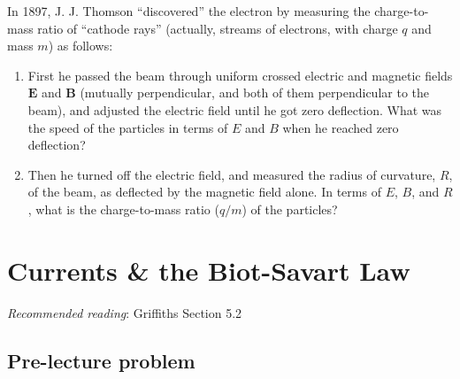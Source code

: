 \documentclass[
  letterpaper,
  DIV=11,
  numbers=noendperiod]{scrreprt}
\begin{document}
In 1897, J. J. Thomson ``discovered'' the electron by measuring the
charge-to-mass ratio of ``cathode rays'' (actually, streams of
electrons, with charge \(q\) and mass \(m\)) as follows:

\begin{enumerate}
\def\labelenumi{(\alph{enumi})}
\item
  First he passed the beam through uniform crossed electric and magnetic
  fields \(\mathrm{\mathbf{E}}\) and \(\mathrm{\mathbf{B}}\) (mutually
  perpendicular, and both of them perpendicular to the beam), and
  adjusted the electric field until he got zero deflection. What was the
  speed of the particles in terms of \(E\) and \(B\) when he reached
  zero deflection?
\item
  Then he turned off the electric field, and measured the radius of
  curvature, \(R\), of the beam, as deflected by the magnetic field
  alone. In terms of \(E\), \(B\), and \(R\), what is the charge-to-mass
  ratio (\(q/m\)) of the particles?
\end{enumerate}


\chapter{Currents \& the Biot-Savart
Law}\label{currents-the-biot-savart-law}

\newcommand{\l}{\mathrm{\mathbf{l}}}
\newcommand{\E}{\mathrm{\mathbf{E}}}
\newcommand{\F}{\mathrm{\mathbf{F}}}
\newcommand{\r}{\mathrm{\mathbf{r}}}
\newcommand{\B}{\mathrm{\mathbf{B}}}
\newcommand{\A}{\mathrm{\mathbf{A}}}
\newcommand{\x}{\mathrm{\mathbf{x}}}
\newcommand{\y}{\mathrm{\mathbf{y}}}
\newcommand{\z}{\mathrm{\mathbf{z}}}
\newcommand{\v}{\mathrm{\mathbf{v}}}
\newcommand{\p}{\mathrm{\mathbf{p}}}
\newcommand{\d}{\mathrm{\mathbf{d}}}

\newcommand{\a}{\mathrm{\mathbf{a}}}
\newcommand{\b}{\mathrm{\mathbf{b}}}
\newcommand{\I}{\mathrm{\mathbf{I}}}
\newcommand{\K}{\mathrm{\mathbf{K}}}
\newcommand{\J}{\mathrm{\mathbf{J}}}
\newcommand{\A}{\mathrm{\mathbf{A}}}
\newcommand{\dd}{\mathrm{d}}

\emph{Recommended reading}: Griffiths Section 5.2

\section{Pre-lecture problem}\label{pre-lecture-problem-3}
\end{document}
